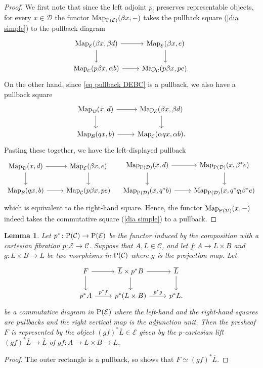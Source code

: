 \documentclass{amsart}
\numberwithin{theorem}{subsection}
\newtheorem{lemma}[theorem]{Lemma}
\theoremstyle{definition}
\newcommand{\Map}{\operatorname{Map}}
\newcommand{\xE}{\mathcal{E}}
\newcommand{\xcc}{\mathcal{C}}
\newcommand{\Pre}{\name{P}}
\newcommand{\name}[1]{\ensuremath{\text{\textup{#1}}}}
\begin{document}
\begin{proof}
We first note that since the left adjoint $p_!$ preserves representable objects, for every $x\in \mathcal{D}$ the functor $\Map_{\Pre(\xE)}(\beta x, -)$ takes the pullback square (\ref{dia simple}) to the pullback diagram
\[ \begin{tikzcd}
\Map_{\xE}(\beta x, \beta d) \rar \dar & \Map_{\xE}(\beta x, e) \dar \\
\Map_{\xcc}(p\beta x, \alpha b) \rar & \Map_{\xcc}(p\beta x, pe ).
\end{tikzcd} \]
On the other hand, since \eqref{eq pullback DEBC} is a pullback, we also have a pullback square 
\[ \begin{tikzcd}
\Map_{\mathcal{D}}(x, d) \rar \dar & \Map_{\xE}(\beta x, \beta d) \dar \\
\Map_{\mathcal{B}}(q x, b) \rar & \Map_{\xcc}(\alpha q x, \alpha b).
\end{tikzcd} \]
Pasting these together, we have the left-displayed pullback
\[ \begin{tikzcd}
\Map_{\mathcal{D}}(x, d) \rar \dar & \Map_{\xE}(\beta x, e) \dar \\
\Map_{\mathcal{B}}(q x, b) \rar & \Map_{\xcc}(p\beta x, pe )
\end{tikzcd} 
\quad
\begin{tikzcd}
\Map_{\Pre(\mathcal{D})}(x, d) \rar \dar & \Map_{\Pre(\mathcal{D})}(x, \beta^*e) \dar \\
\Map_{\Pre(\mathcal{D})}(x, q^*b) \rar & \Map_{\Pre(\mathcal{D})}(x, q^*q_!\beta^*e )
\end{tikzcd}
 \]
which is equivalent to the right-hand square. Hence, the functor $\Map_{\Pre(\mathcal{D})}(x,-)$ indeed takes the commutative square (\ref{dia simple}) to a pullback.
\end{proof}

\begin{lemma}\label{lemma simple}
	Let $p^*\colon \Pre(\xcc)\to \Pre(\xE)$ be the functor induced by the composition with a cartesian fibration $p\colon \xE\to \xcc$.
	Suppose that $A,L\in \xcc$, and let $f\colon A\to L\times B$ and $g\colon L \times B\to L$ be two morphisms in $\Pre(\xcc)$ where $g$ is the projection map.
		Let  \[
		\begin{tikzcd}
		F \arrow{r} \arrow{d} & \overline L\times p^*B \arrow{r} \arrow{d} &
		\overline L \arrow{d}\\
		p^{*}A \arrow{r}{p^*f} & p^{*}(L\times B) \arrow{r}{p^*g} & p^{*}L.
		\end{tikzcd}
		\]
		be a commutative diagram in $\Pre(\xE)$ where the left-hand and the right-hand squares are pullbacks and the right vertical map is the adjunction unit.
		Then the presheaf $F$ is represented by the object $(gf)^*\overline L\in \xE$ given by the $p$-cartesian lift $(gf)^*\overline L\to \overline L$ of $gf\colon A\to L \times B\to L$.
\end{lemma}
\begin{proof}
The outer rectangle is a pullback, so \cite[Lemma 2.7.10]{ChuHaugseng} shows that $F\simeq (gf)^*\overline L$.
\end{proof}
\end{document}

